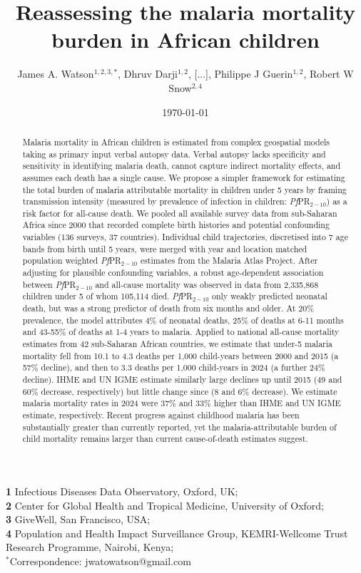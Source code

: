 \documentclass[12pt]{article}
\title{Reassessing the malaria mortality burden in African children}
\author{
James A. Watson$^{1,2,3,*}$, Dhruv Darji$^{1,2}$, [...], Philippe J Guerin$^{1,2}$, Robert W Snow$^{2,4}$
}
\date{\today}
\begin{document}
\maketitle


\small\noindent\textbf{1} Infectious Diseases Data Observatory, Oxford, UK;\\
\small\textbf{2} Center for Global Health and Tropical Medicine, University of Oxford;\\
\small\textbf{3} GiveWell, San Francisco, USA;\\
\small\textbf{4} Population and Health Impact Surveillance Group, KEMRI-Wellcome Trust Research Programme, Nairobi, Kenya;\\
\small $^{*}$Correspondence: jwatowatson@gmail.com






\begin{abstract}
    Malaria mortality in African children is estimated from complex geospatial models taking as primary input verbal autopsy data. Verbal autopsy lacks specificity and sensitivity in identifying malaria death, cannot capture indirect mortality effects, and assumes each death has a single cause. We propose a simpler framework for estimating the total burden of malaria attributable mortality in children under 5 years by framing transmission intensity (measured by prevalence of infection in children: \textit{Pf}PR$_{2-10}$) as a risk factor for all-cause death.
    We pooled all available survey data from sub-Saharan Africa since 2000 that recorded complete birth histories and potential confounding variables (136 surveys, 37 countries). Individual child trajectories, discretised into 7 age bands from birth until 5 years, were merged with year and location matched population weighted \textit{Pf}PR$_{2-10}$ estimates from the Malaria Atlas Project. After adjusting for plausible confounding variables, a robust age-dependent association between \textit{Pf}PR$_{2-10}$ and all-cause mortality was observed in data from 2,335,868 children under 5 of whom 105,114 died. \textit{Pf}PR$_{2-10}$ only weakly predicted neonatal death, but was a strong predictor of death from six months and older. At 20\% prevalence, the model attributes 4\% of neonatal deaths, 25\% of deaths at 6-11 months and 43-55\% of deaths at 1-4 years to malaria.
    Applied to national all-cause mortality estimates from 42 sub-Saharan African countries, we estimate that under-5 malaria mortality fell from 10.1 to 4.3 deaths per 1,000 child-years between 2000 and 2015 (a 57\% decline), and then to 3.3 deaths per 1,000 child-years in 2024 (a further 24\% decline). IHME and UN IGME estimate similarly large declines up until 2015 (49 and 60\% decrease, respectively) but little change since (8 and 6\% decrease). We estimate malaria mortality rates in 2024 were 37\% and 33\% higher than IHME and UN IGME estimate, respectively. Recent progress against childhood malaria has been substantially greater than currently reported, yet the malaria-attributable burden of child mortality remains larger than current cause-of-death estimates suggest.
\end{abstract}
\end{document}
